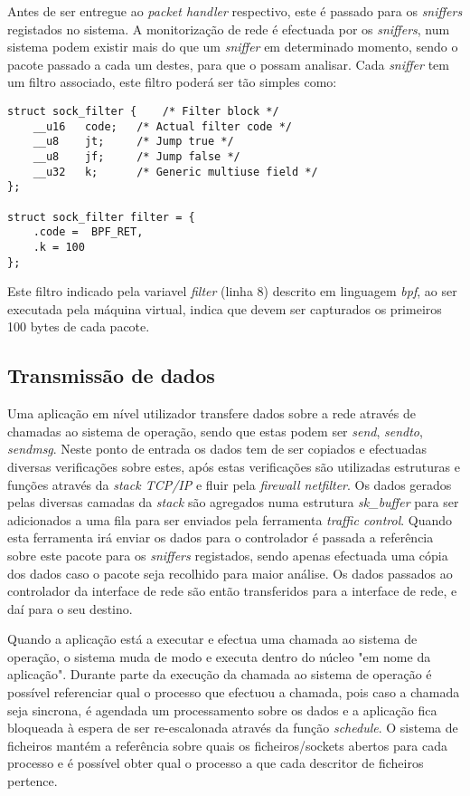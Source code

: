 Antes de ser entregue ao \textit{packet handler} respectivo, este é passado para os \textit{sniffers} registados no sistema.
A monitorização de rede é efectuada por os \textit{sniffers}, num sistema podem existir mais do que um \textit{sniffer} em determinado momento, sendo o pacote passado a cada um destes, para que o possam analisar.
Cada \textit{sniffer} tem um filtro associado, este filtro poderá ser tão simples como:

\begin{lstlisting}
struct sock_filter {    /* Filter block */
	__u16	code;   /* Actual filter code */
	__u8 	jt;     /* Jump true */
	__u8 	jf;     /* Jump false */
	__u32	k;      /* Generic multiuse field */
};

struct sock_filter filter = {
	.code =  BPF_RET,
	.k = 100
};
\end{lstlisting}

Este filtro indicado pela variavel \textit{filter} (linha 8) descrito em linguagem \textit{bpf}, ao ser executada pela máquina virtual, indica que devem ser capturados os primeiros 100 bytes de cada pacote.

\subsection{Transmissão de dados}

Uma aplicação em nível utilizador transfere dados sobre a rede através de chamadas ao sistema de operação, sendo que estas podem ser \textit{send}, \textit{sendto}, \textit{sendmsg}.
Neste ponto de entrada os dados tem de ser copiados e efectuadas diversas verificações sobre estes, após estas verificações são utilizadas estruturas e funções através da \textit{stack TCP/IP} e fluir pela \textit{firewall netfilter}.
Os dados gerados pelas diversas camadas da \textit{stack} são agregados numa estrutura \textit{sk\_buffer} para ser adicionados a uma fila para ser enviados pela ferramenta \textit{traffic control}.
Quando esta ferramenta irá enviar os dados para o controlador é passada a referência sobre este pacote para os \textit{sniffers} registados, sendo apenas efectuada uma cópia dos dados caso o pacote seja recolhido para maior análise. Os dados passados ao controlador da interface de rede são então transferidos para a interface de rede, e daí para o seu destino.

Quando a aplicação está a executar e efectua uma chamada ao sistema de operação, o sistema muda de modo e executa dentro do núcleo "em nome da aplicação".
 Durante parte da execução da chamada ao sistema de operação é possível referenciar qual o processo que efectuou a chamada, pois caso a chamada seja sincrona, é agendada um processamento sobre os dados e a aplicação fica bloqueada à espera de ser re-escalonada através da função \textit{schedule}.
 O sistema de ficheiros mantém a referência sobre quais os ficheiros/sockets abertos para cada processo e é possível obter qual o processo a que cada descritor de ficheiros pertence. %

